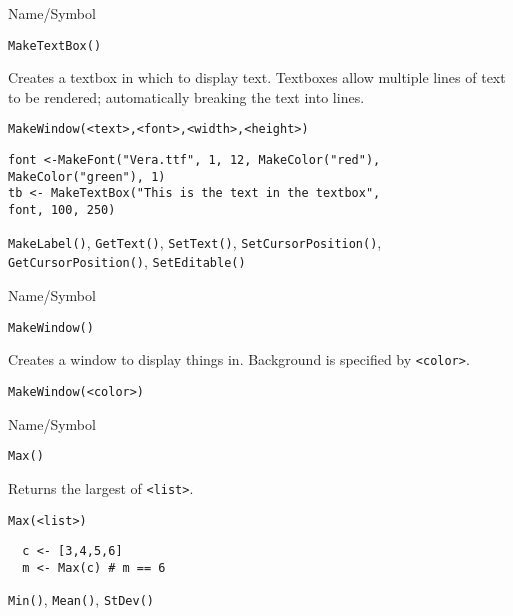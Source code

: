 \rl



\begin{desc}{Name/Symbol}
\item[Name/Symbol]	\verb+MakeTextBox()+

\item[Description]	Creates a textbox in which to display text. 
		Textboxes allow multiple lines of text to be rendered;
		automatically breaking the text into lines. 

\item[Usage]
\begin{verbatim}
MakeWindow(<text>,<font>,<width>,<height>)
\end{verbatim}

\item[Example]	
\begin{verbatim}
font <-MakeFont("Vera.ttf", 1, 12, MakeColor("red"), 
MakeColor("green"), 1)
tb <- MakeTextBox("This is the text in the textbox", 
font, 100, 250)
\end{verbatim}

\item[See Also]	\verb+MakeLabel()+, \verb+GetText()+, \verb+SetText()+, \verb+SetCursorPosition()+,
		\verb+GetCursorPosition()+, \verb+SetEditable()+
\end{desc}

\rl


\begin{desc}{Name/Symbol}
\item[Name/Symbol]	\verb+MakeWindow()+ 

\item[Description]	Creates a window to display things in.
		Background is specified by \verb+<color>+.

\item[Usage]		
\begin{verbatim}
MakeWindow(<color>)
\end{verbatim}

\item[Example]	

\item[See Also]	
\end{desc}

\rl


\begin{desc}{Name/Symbol}
\item[Name/Symbol]	\verb+Max()+            

\item[Description] Returns the largest of \verb+<list>+.

\item[Usage]		
\begin{verbatim}
Max(<list>)
\end{verbatim}

\item[Example]	
\begin{verbatim} 
  c <- [3,4,5,6]
  m <- Max(c) # m == 6
\end{verbatim}

\item[See Also]	\verb+Min()+, \verb+Mean()+, \verb+StDev()+
\end{desc}


